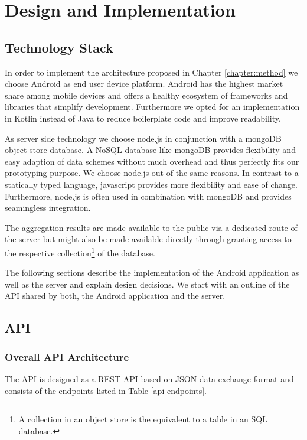 \chapter{Design and Implementation}\label{chapter:design}

\section{Technology Stack}
In order to implement the architecture proposed in Chapter \ref{chapter:method} we choose Android as end user device platform. Android has the highest market share among mobile devices \cite{android-market-share} and offers a healthy ecosystem of frameworks and libraries that simplify development. Furthermore we opted for an implementation in Kotlin instead of Java to reduce boilerplate code and improve readability.

As server side technology we choose node.js in conjunction with a mongoDB object store database. A NoSQL database like mongoDB provides flexibility and easy adaption of data schemes without much overhead and thus perfectly fits our prototyping purpose. We choose node.js out of the same reasons. In contrast to a statically typed language, javascript provides more flexibility and ease of change. Furthermore, node.js is often used in combination with mongoDB and provides seamingless integration.

The aggregation results are made available to the public via a dedicated route of the server but might also be made available directly through granting access to the respective collection\footnote{A collection in an object store is the equivalent to a table in an SQL database.} of the database.

The following sections describe the implementation of the Android application as well as the server and explain design decisions. We start with an outline of the API shared by both, the Android application and the server.\\

\section{API}\label{api}
\subsection{Overall API Architecture}
The API is designed as a REST API based on JSON data exchange format and consists of the endpoints listed in Table \ref{api-endpoints}.


